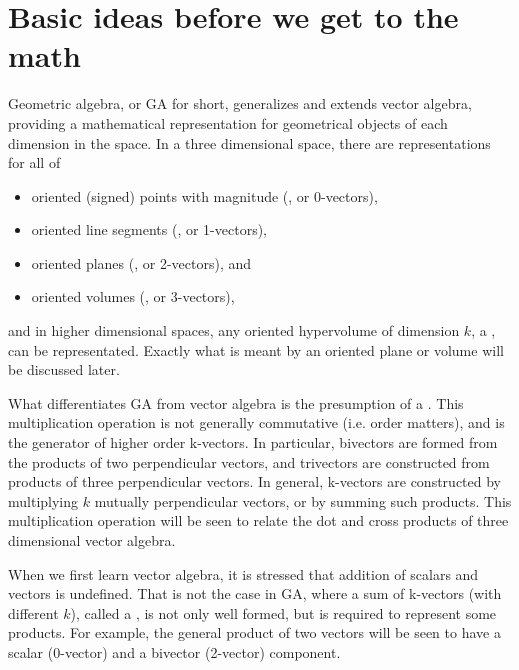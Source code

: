 \section{Basic ideas before we get to the math}
Geometric algebra, or GA for short, generalizes and extends vector algebra, providing a mathematical representation for geometrical objects of each dimension in the space.
In a three dimensional space, there are representations for all of

\begin{itemize}
\item
oriented (signed) points with magnitude (, or 0-vectors),
\item
oriented line segments (, or 1-vectors),
\item
oriented planes (, or 2-vectors), and
\item
oriented volumes (, or 3-vectors),
\end{itemize}

and in higher dimensional spaces, any oriented hypervolume of dimension \( k \), a , can be representated.
Exactly what is meant by an oriented plane or volume will be discussed later.

What
differentiates GA from vector algebra is the presumption of a .
This
multiplication operation is not generally commutative (i.e. order matters), and is the generator of higher order k-vectors.
In particular,
bivectors are formed from the products of two perpendicular vectors,
and trivectors are constructed from products of three perpendicular vectors.
In general, k-vectors are constructed by multiplying \( k \) mutually perpendicular vectors, or by summing such products.
This multiplication operation will be seen to relate the dot and cross products of three dimensional vector algebra.

When we first learn vector algebra, it is stressed that addition of scalars and vectors is undefined.
That is not the case in GA, where a sum of k-vectors (with different \(k\)), called a , is
not only well formed, but is required to represent some products.
For example, the general product of two vectors will be seen to have a scalar (0-vector) and a bivector (2-vector) component.


